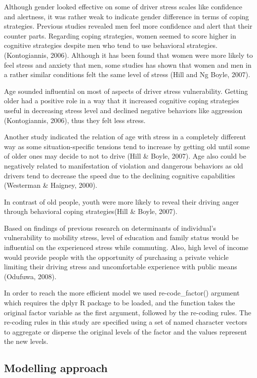 \documentclass[
11pt, %
oneside, %
english, %
singlespacing, %
]{macthesis} %
\begin{document}
Although gender looked effective on some of driver stress scales like confidence and alertness, it was rather weak to indicate gender difference in terms of coping strategies. Previous studies revealed men feel more confidence and alert that their counter parts. Regarding coping strategies, women seemed to score higher in cognitive strategies despite men who tend to use behavioral strategies. (Kontogiannis, 2006). Although it has been found that women were more likely to feel stress and anxiety that men, some studies has shown that women and men in a rather similar conditions felt the same level of stress (Hill and Ng Boyle, 2007).

Age sounded influential on most of aspects of driver stress vulnerability. Getting older had a positive role in a way that it increased cognitive coping strategies useful in decreasing stress level and declined negative behaviors like aggression (Kontogiannis, 2006), thus they felt less stress.

Another study indicated the relation of age with stress in a completely different way as some situation-specific tensions tend to increase by getting old until some of older ones may decide to not to drive (Hill \& Boyle, 2007). Age also could be negatively related to manifestation of violation and dangerous behaviors as old drivers tend to decrease the speed due to the declining cognitive capabilities (Westerman \& Haigney, 2000).

In contrast of old people, youth were more likely to reveal their driving anger through behavioral coping strategies(Hill \& Boyle, 2007).

Based on findings of previous research on determinants of individual's vulnerability to mobility stress, level of education and family status would be influential on the experienced stress while commuting. Also, high level of income would provide people with the opportunity of purchasing a private vehicle limiting their driving stress and uncomfortable experience with public means (Odufuwa, 2008).

In order to reach the more efficient model we used re-code\_factor() argument which requires the dplyr R package to be loaded, and the function takes the original factor variable as the first argument, followed by the re-coding rules. The re-coding rules in this study are specified using a set of named character vectors to aggregate or disperse the original levels of the factor and the values represent the new levels.

\hypertarget{modelling-approach}{%
\subsection{Modelling approach}\label{modelling-approach}}
\end{document}
